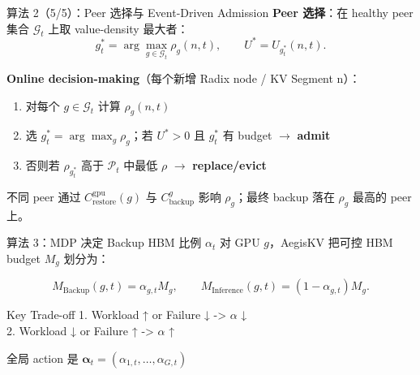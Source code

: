 \documentclass[aspectratio=43]{beamer}
\begin{document}
\begin{frame}{算法 2（5/5）：Peer 选择与 Event-Driven Admission}
  \small
  \textbf{Peer 选择}：在 healthy peer 集合 $\mathcal{G}_t$ 上取 value-density 最大者：
  \[
    g_t^* = \arg\max_{g \in \mathcal{G}_t} \rho_g(n,t),
    \qquad
    U^* = U_{g_t^*}(n,t).
  \]

  \vspace{0.08cm}
  \textbf{Online decision-making}（每个新增 Radix node / KV Segment n）：
  \begin{enumerate}
    \item 对每个 $g \in \mathcal{G}_t$ 计算 $\rho_g(n,t)$
    \item 选 $g_t^* = \arg\max_g \rho_g$；若 $U^*>0$ 且 $g_t^*$ 有 budget $\rightarrow$ \textbf{admit}
    \item 否则若 $\rho_{g_t^*}$ 高于 $\mathcal{P}_t$ 中最低 $\rho$ $\rightarrow$ \textbf{replace/evict}
  \end{enumerate}

  \vspace{0.06cm}
  \footnotesize
  不同 peer 通过 $C_{\mathrm{restore}}^{\mathrm{gpu}}(g)$ 与 $C_{\mathrm{backup}}^g$ 影响 $\rho_g$；最终 backup 落在 $\rho_g$ 最高的 peer 上。
\end{frame}

\begin{frame}{算法 3：MDP 决定 Backup HBM 比例 $\alpha_t$}
  \small
  对 GPU $g$，AegisKV 把可控 HBM budget $M_g$ 划分为：

  \vspace{0.10cm}
  \[
    M_{\mathrm{Backup}}(g,t) = \alpha_{g,t} M_g,
    \qquad
    M_{\mathrm{Inference}}(g,t) = (1-\alpha_{g,t})M_g .
  \]

  \vspace{0.10cm}
  \begin{block}{Key Trade-off}
    1. Workload ↑ or Failure ↓ -> $\alpha$ ↓ \\
    2. Workload ↓ or Failure ↑ -> $\alpha$ ↑
  \end{block}

  \vspace{0.10cm}
  \footnotesize
  全局 action 是 $\boldsymbol{\alpha}_t=(\alpha_{1,t},\ldots,\alpha_{G,t})$
\end{frame}
\end{document}
